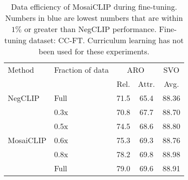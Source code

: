 \documentclass[11pt]{article}
\newcommand{\methodcomp}{MosaiCLIP}
\newcommand{\negclip}{NegCLIP}
\begin{document}
\begin{table}[h!]
\small
\centering
    \begin{tabular}{llcc|c}
    \toprule
    {Method} & Fraction of data& \multicolumn{2}{c|}{ARO} & \multicolumn{1}{c}{SVO} \\
    \cmidrule(lr){3-4} \cmidrule(lr){5-5}
    & & Rel. & Attr. & Avg. \\
    \midrule
    \negclip{} & Full & 71.5 & 65.4 & 88.36 \\
    \midrule
    \multirow{5}{*}{\methodcomp{}} & 0.3x & {\color{blue}70.8} & {\color{blue}67.7} & {\color{blue}88.70} \\
    & 0.5x & 74.5 & 68.6 & 88.80 \\
    & 0.6x & 75.3 & 69.3 & 88.76 \\
    & 0.8x & 78.2 & 69.8 & 88.98 \\
    & Full & 79.0 & 69.6 & 88.91 \\
    \bottomrule
    \end{tabular}

    \caption{Data efficiency of \methodcomp{} during fine-tuning. Numbers in blue are lowest numbers that are within $1\%$ or greater than \negclip{} performance. Fine-tuning dataset: CC-FT. Curriculum learning has not been used for these experiments.}
    \label{data_eff_ft}
\end{table}
\end{document}

